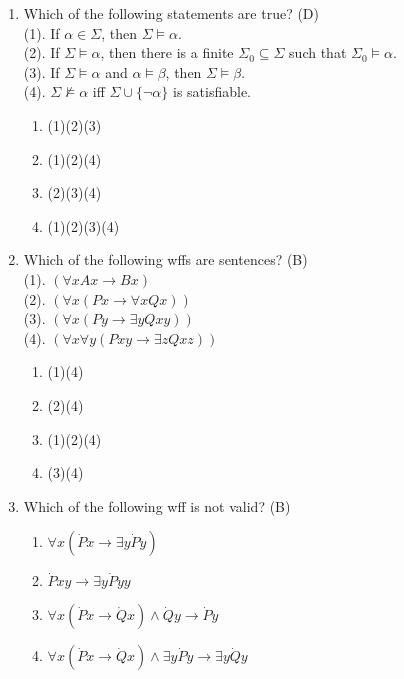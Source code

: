 \documentclass{article}
\begin{document}
\begin{enumerate}
\item Which of the following statements are true? (D)\\
(1). If $\alpha \in \Sigma$, then $\Sigma \models \alpha$.\\
(2). If $\Sigma \models \alpha$, then there is a finite $\Sigma_0 \subseteq \Sigma$ such that $\Sigma_0 \models \alpha$.\\
(3). If $\Sigma \models \alpha$ and $\alpha \models \beta$, then $\Sigma \models \beta$.\\
(4). $\Sigma \not\models \alpha$ iff $\Sigma \cup \{\lnot \alpha \}$ is satisfiable.\\
    \begin{enumerate}
        \item (1)(2)(3)
        \item (1)(2)(4)
        \item (2)(3)(4)
        \item (1)(2)(3)(4)
    \end{enumerate}

\item Which of the following wffs are sentences? (B)\\
(1). $(\forall xAx\rightarrow Bx)$\\
(2). $(\forall x(Px\rightarrow \forall xQx ))$\\
(3). $(\forall x(Py\rightarrow \exists y Q x y))$\\
(4). $(\forall x \forall y (P x y \rightarrow \exists z Qxz))$
    \begin{enumerate}
        \item (1)(4)
        \item (2)(4)
        \item (1)(2)(4)
        \item (3)(4)
    \end{enumerate}

\item Which of the following wff is not valid? (B)
    \begin{enumerate}
        \item $\forall x (\dot{P}x\rightarrow \exists y\dot{P}y)$
        \item $\dot{P}xy \rightarrow \exists y \dot{P}yy$
        \item $\forall x(\dot{P}x\rightarrow \dot{Q}x)\land \dot{Q}y \rightarrow \dot{P}y$
        \item $\forall x(\dot{P}x\rightarrow \dot{Q}x)\land \exists y \dot{P}y \rightarrow \exists y \dot{Q}y$
    \end{enumerate}

\end{enumerate}
\end{document}
